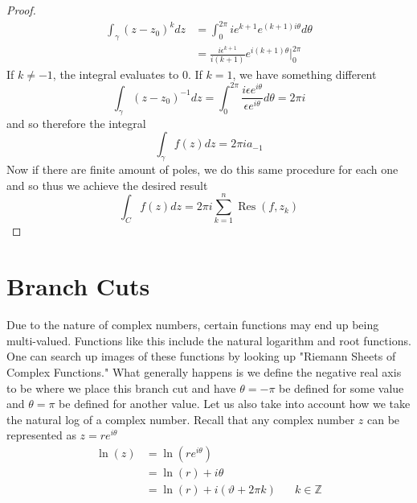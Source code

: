 \documentclass{report}
\theoremstyle{definition}
\theoremstyle{remark}
\newcommand{\twen}{\hspace{20pt}}
\begin{document}
\begin{proof}
\begin{equation*}
        \begin{split}
            \int_\gamma (z-z_0)^kdz &=\int^{2\pi}_0 ie^{k+1}e^{(k+1)i\theta}d\theta \\
            &= \frac{i\epsilon^{k+1}}{i(k+1)}e^{i(k+1)\theta} \Bigg|^{2\pi}_0
        \end{split}
    \end{equation*}
    If $k\neq -1$, the integral evaluates to 0. If $k=1$, we have something different
    \begin{equation*}
        \int_\gamma (z-z_0)^{-1}dz = \int^{2\pi}_0 \frac{i\epsilon e^{i\theta}}{\epsilon e^{i\theta}} d\theta =2\pi i
    \end{equation*}
    and so therefore the integral 
    \begin{equation*}
        \int_\gamma f(z)dz = 2\pi i a_{-1}
    \end{equation*}
    Now if there are finite amount of poles, we do this same procedure for each one and so thus we achieve the desired result 
    \begin{equation*}
        \int_C f(z)dz = 2\pi i \sum^n_{k=1}\operatorname{Res}(f,z_k)
    \end{equation*}
\end{proof}
\section{Branch Cuts}
Due to the nature of complex numbers, certain functions may end up being multi-valued. Functions like this include the natural logarithm and root functions. One can search up images of these functions by looking up "Riemann Sheets of Complex Functions." What generally happens is we define the negative real axis to be where we place this branch cut and have $\theta=-\pi$ be defined for some value and $\theta=\pi$ be defined for another value. Let us also take into account how we take the natural log of a complex number. Recall that any complex number $z$ can be represented as $z=re^{i\theta}$
\begin{equation*}
    \begin{split}
        \ln(z) &= \ln(re^{i\theta}) \\
        &=\ln(r)+i\theta \\
        &= \ln (r) + i(\vartheta +2\pi k) \twen k\in \mathbb{Z}
    \end{split}
\end{equation*}
\end{document}
